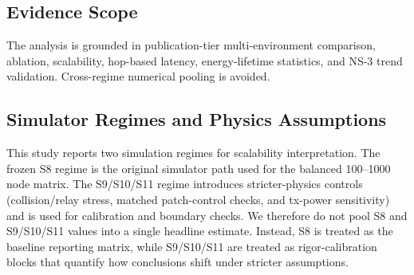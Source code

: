 ﻿\documentclass[sensors,article,submit,moreauthors,pdftex]{Definitions/mdpi}
\begin{document}
\subsection{Evidence Scope}
The analysis is grounded in publication-tier multi-environment comparison, ablation, scalability, hop-based latency, energy-lifetime statistics, and NS-3 trend validation. Cross-regime numerical pooling is avoided.

\subsection{Simulator Regimes and Physics Assumptions}
This study reports two simulation regimes for scalability interpretation. The frozen S8 regime is the original simulator path used for the balanced 100--1000 node matrix. The S9/S10/S11 regime introduces stricter-physics controls (collision/relay stress, matched patch-control checks, and tx-power sensitivity) and is used for calibration and boundary checks. We therefore do not pool S8 and S9/S10/S11 values into a single headline estimate. Instead, S8 is treated as the baseline reporting matrix, while S9/S10/S11 are treated as rigor-calibration blocks that quantify how conclusions shift under stricter assumptions.

\begin{table}[H]
\caption{Evidence-regime map used in this manuscript.}
\label{tab:regime_map}
\centering
{}
\end{table}
\end{document}
